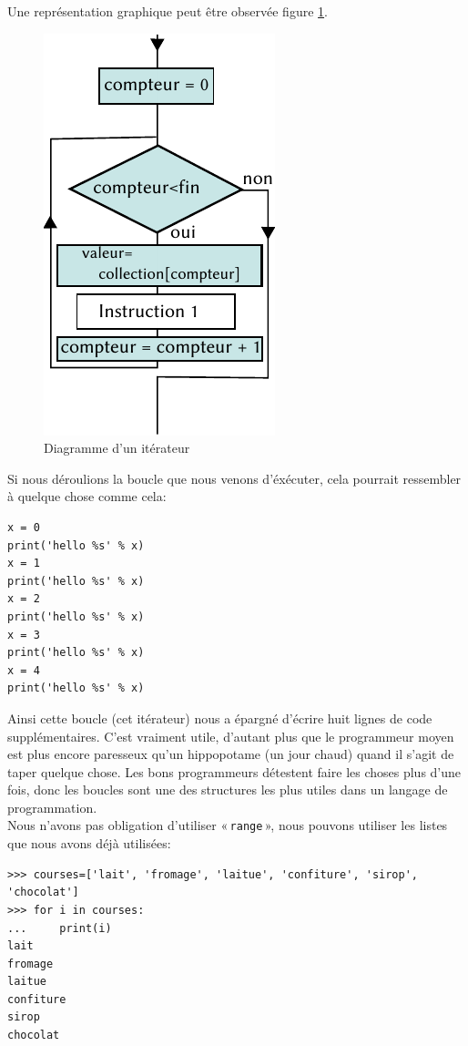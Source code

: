 Une représentation graphique peut être observée figure \ref{fig:for}.
\begin{figure}[ht]
\centering
\includegraphics[scale=1.5]{images/for.pdf}
\caption{Diagramme d'un itérateur}
\label{fig:for}
\end{figure}

Si nous déroulions la boucle que nous venons d'éxécuter, cela pourrait ressembler à quelque chose comme cela:

\begin{Verbatim}[frame=single,rulecolor=\color{gray}, label=ne pas saisir]
x = 0
print('hello %s' % x)
x = 1
print('hello %s' % x)
x = 2
print('hello %s' % x)
x = 3
print('hello %s' % x)
x = 4
print('hello %s' % x)
\end{Verbatim}

Ainsi cette boucle (cet itérateur) nous a épargné d'écrire huit lignes de code supplémentaires. C'est vraiment utile, d'autant plus que le programmeur moyen est plus encore paresseux qu'un hippopotame (un jour chaud) quand il s'agit de taper quelque chose. Les bons programmeurs détestent faire les choses plus d'une fois, donc les boucles sont une des structures les plus utiles dans un langage de programmation.\\

Nous n'avons pas obligation d'utiliser « \texttt{range} », nous pouvons utiliser les listes que nous avons déjà utilisées:

\begin{small}
\begin{Verbatim}[frame=single,rulecolor=\color{green}, label=à taper avec attention]
>>> courses=['lait', 'fromage', 'laitue', 'confiture', 'sirop', 'chocolat']
>>> for i in courses:
...     print(i)
lait
fromage
laitue
confiture
sirop
chocolat
\end{Verbatim}
\end{small}

